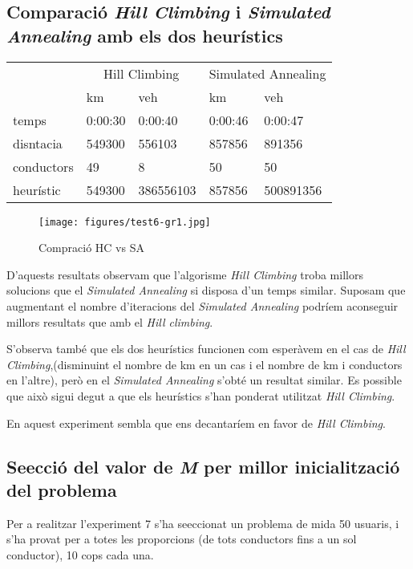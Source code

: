 \subsection{Comparació \emph{Hill Climbing} i \emph{Simulated Annealing} amb els dos heurístics}

\begin{center}
\begin{tabular}{l|llll}
 & \multicolumn{2}{c}{Hill Climbing} & \multicolumn{2}{c}{Simulated Annealing}\\
           & km       & veh       & km        & veh\\
\hline
temps      & 0:00:30  &  0:00:40  &  0:00:46  &  0:00:47\\
disntacia  & 549300   & 556103    &  857856   & 891356\\
conductors & 49       & 8         & 50        & 50\\
heurístic  & 549300   & 386556103 & 857856    & 500891356
\end{tabular}
\end{center}

\begin{figure}[H]
\begin{center}
 \texttt{[image: figures/test6-gr1.jpg]}
 \label{test6-gr1}
\caption{Compració HC vs SA}
\end{center}
\end{figure}

D'aquests resultats observam que l'algorisme \emph{Hill Climbing} troba millors solucions que el \emph{Simulated Annealing} si disposa d'un temps similar.
Suposam que augmentant el nombre d'iteracions del \emph{Simulated Annealing} podríem aconseguir millors resultats que amb el \emph{Hill climbing}.


S'observa també que els dos heurístics funcionen com esperàvem en el cas de \emph{Hill Climbing},(disminuint el nombre de km en un cas
i el nombre de km i conductors en l'altre), però en el \emph{Simulated Annealing} s'obté un resultat similar.
Es possible que això sigui degut a que els heurístics s'han ponderat utilitzat \emph{Hill Climbing}.

En aquest experiment sembla que ens decantaríem en favor de \emph{Hill Climbing}.






\subsection{Se\lgem ecció del valor de \emph{M} per millor inicialització del problema}
Per a realitzar l'experiment 7 s'ha se\lgem eccionat un problema de mida 50 usuaris, i s'ha provat per a totes les proporcions
(de tots conductors fins a un sol conductor), 10 cops cada una.

